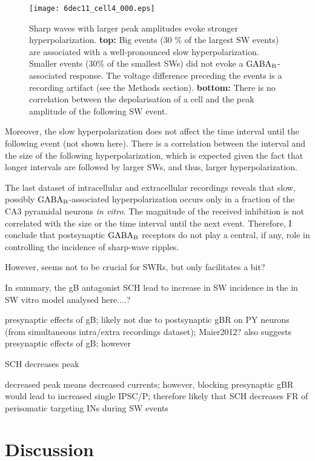     \begin{figure}
      \texttt{[image: 6dec11\_cell4\_000.eps]}
      \caption{ 
        Sharp waves with larger peak amplitudes evoke stronger
        hyperpolarization. {\bf top:} Big events (30 \% of the largest SW
        events) are associated with a well-pronounced slow hyperpolarization.
        Smaller events (30\% of the smallest SWs) did not evoke a $\rm
        GABA_B$-associated response. The voltage difference preceding the
        events is a recording artifact (see the Methods section). {\bf bottom:}
        There is no correlation between the depolarisation of a cell and the
        peak amplitude of the following SW event.
              }
    \end{figure}

    Moreover, the slow hyperpolarization does not affect the time interval
    until the following event (not shown here). There is a correlation between
    the interval and the size of the following hyperpolarization, which is
    expected given the fact that longer intervals are followed by larger SWs,
    and thus, larger hyperpolarization.

    The last dataset of intracellular and extracellular recordings reveals that
    slow, possibly $\rm GABA_B$-associated hyperpolarization occurs only in a
    fraction of the CA3 pyramidal neurons {\textit{in vitro}}. The magnitude of
    the received inhibition is not correlated with the size or the time
    interval until the next event. Therefore, I conclude that postsynaptic $\rm
    GABA_B$ receptors do not play a central, if any, role in controlling the
    incidence of sharp-wave ripples.
 
    However, seems not to be crucial for SWRs, but only facilitates a bit?

    In summary, the gB antagonist SCH lead to increase in SW incidence in the in SW vitro model analysed here....?

    presynaptic effects of gB; likely not due to postsynaptic gBR on PY neurons (from simultaneous intra/extra recordings dataset); Maier2012? also suggests presynaptic effects of gB; however
      
    SCH decreases peak
      
    decreased peak means decreased currents; however, blocking presynaptic gBR would lead to increased single IPSC/P; therefore likely that SCH decreases FR of perisomatic targeting INs during SW events

\section{Discussion}

